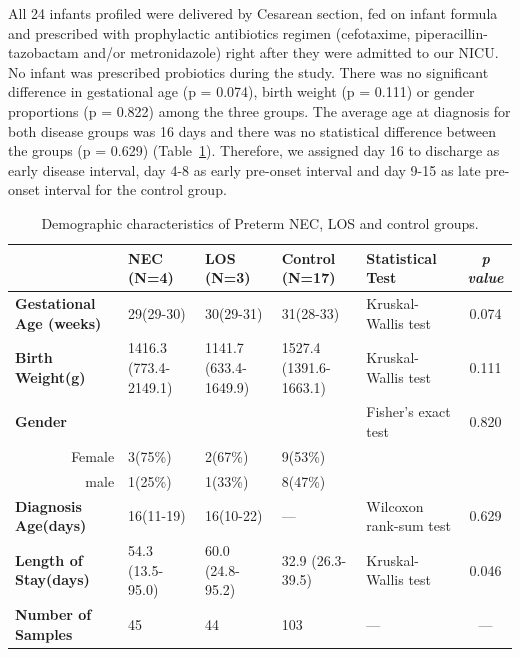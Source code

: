\documentclass[fleqn,10pt, lineno]{wlpeerj} %
\begin{document}
   All 24 infants profiled were delivered by Cesarean section, fed on infant formula and prescribed with prophylactic antibiotics regimen (cefotaxime, piperacillin-tazobactam and/or metronidazole) right after they were admitted to our NICU. No infant was prescribed probiotics during the study. There was no significant difference in gestational age (p = 0.074), birth weight (p = 0.111) or gender proportions (p = 0.822) among the three groups. The average age at diagnosis for both disease groups was 16 days and there was no statistical difference between the groups (p = 0.629) (Table~\ref{tab:demographic}). Therefore, we assigned day 16 to discharge as early disease interval, day 4-8 as early pre-onset interval and day 9-15 as late pre-onset interval for the control group.
    \begin{table}[!hpb]
       \centering
       \caption{\label{tab:demographic}Demographic characteristics of Preterm NEC, LOS and control groups.}
      \begin{tabular}{lp{1.8cm}p{1.8cm}p{1.8cm}p{2cm}c}
        \toprule
          & \textbf{NEC (N=4)} & \textbf{LOS (N=3)} & \textbf{Control (N=17)} & \textbf{Statistical Test} & \textit{p value} \\ \midrule
        \textbf{Gestational Age (weeks)} & 29(29-30) & 30(29-31) & 31(28-33) & Kruskal-Wallis test & 0.074 \\
        \textbf{Birth Weight(g)} & 1416.3 (773.4-2149.1) & 1141.7 (633.4-1649.9) & 1527.4 (1391.6-1663.1) & Kruskal-Wallis test & 0.111 \\
        \textbf{Gender} &  &  &  & Fisher's exact test & 0.820 \\
        \multicolumn{1}{r}{Female} & 3(75\%) & 2(67\%) & 9(53\%) &  & \\
        \multicolumn{1}{r}{male} & 1(25\%) & 1(33\%) & 8(47\%) &  & \\
        \textbf{Diagnosis Age(days)} & 16(11-19) & 16(10-22) & — & Wilcoxon rank-sum test & 0.629 \\
        \textbf{Length of Stay(days)} & 54.3 (13.5-95.0) & 60.0 (24.8-95.2) & 32.9 (26.3-39.5) & Kruskal-Wallis test & 0.046 \\
        \textbf{Number of Samples} & 45 & 44 & 103 & — & — \\ \bottomrule
      \end{tabular}
    \end{table}
\end{document}
